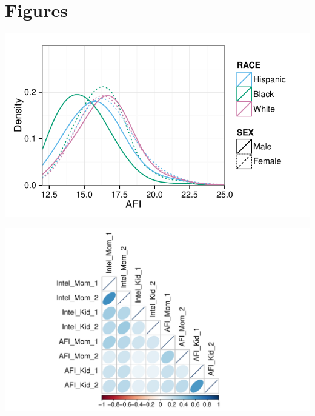 \documentclass[a4paper,man,apacite,natbib,12pt]{apa6}\usepackage[]{graphicx}\usepackage[]{color}
\newenvironment{knitrout}{}{} %
\begin{document}
\section{Figures}
\begin{center}
\label{plot_afi_by_race_sex}
\begin{knitrout}
\color{fgcolor}
\includegraphics[width=.8\paperwidth]{figure/plot_afi_by_race_sex-1} 

\end{knitrout}
\end{center}
\pagebreak
%
\begin{center}
\label{plot_between}
\begin{knitrout}
\color{fgcolor}
\includegraphics[width=1.1\paperwidth]{figure/plot_corplotmatrix_between-1} 

\end{knitrout}
\end{center}
\end{document}
